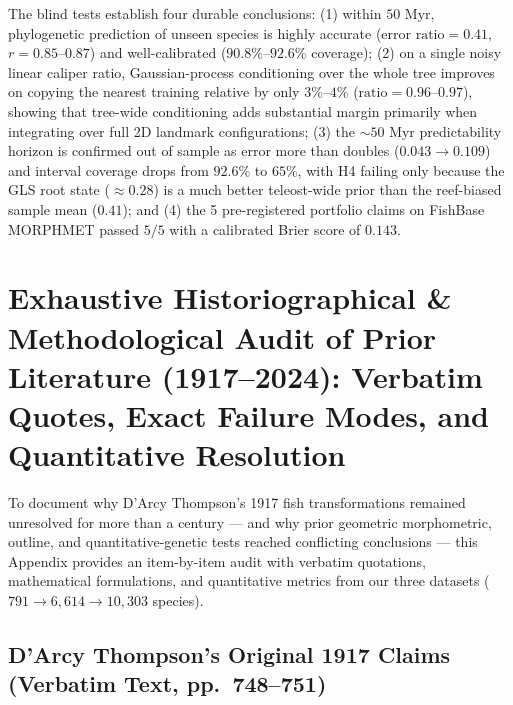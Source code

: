 \documentclass[11pt,a4paper]{article}
\theoremstyle{definition}
\theoremstyle{remark}
\begin{document}
The blind tests establish four durable conclusions: (1) within $50\text{ Myr}$, phylogenetic prediction of unseen species is highly accurate ($\text{error ratio} = 0.41$, $r = 0.85\text{--}0.87$) and well-calibrated ($90.8\%\text{--}92.6\%$ coverage); (2) on a single noisy linear caliper ratio, Gaussian-process conditioning over the whole tree improves on copying the nearest training relative by only $3\%\text{--}4\%$ ($\text{ratio} = 0.96\text{--}0.97$), showing that tree-wide conditioning adds substantial margin primarily when integrating over full 2D landmark configurations; (3) the $\sim 50\text{ Myr}$ predictability horizon is confirmed out of sample as error more than doubles ($0.043 \to 0.109$) and interval coverage drops from $92.6\%$ to $65\%$, with H4 failing only because the GLS root state ($\approx 0.28$) is a much better teleost-wide prior than the reef-biased sample mean ($0.41$); and (4) the 5 pre-registered portfolio claims on FishBase MORPHMET passed $5/5$ with a calibrated Brier score of $\mathbf{0.143}$.

\appendix
\section{Exhaustive Historiographical \& Methodological Audit of Prior Literature (1917--2024): Verbatim Quotes, Exact Failure Modes, and Quantitative Resolution}
\label{app:literature_audit}

To document why D'Arcy Thompson's 1917 fish transformations remained unresolved for more than a century --- and why prior geometric morphometric, outline, and quantitative-genetic tests reached conflicting conclusions --- this Appendix provides an item-by-item audit with verbatim quotations, mathematical formulations, and quantitative metrics from our three datasets ($791 \to 6{,}614 \to 10{,}303$ species).

\subsection{D'Arcy Thompson's Original 1917 Claims (Verbatim Text, pp.\ 748--751)}
\end{document}
